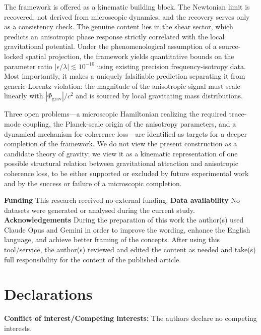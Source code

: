 \documentclass[a4paper,fleqn]{cas-dc}
\theoremstyle{thmstyleone}%
\theoremstyle{thmstyletwo}%
\begin{document}
The framework is offered as a kinematic building block. The
Newtonian limit is recovered, not derived from microscopic
dynamics, and the recovery serves only as a consistency check.
The genuine content lies in the shear sector, which predicts
an anisotropic phase response strictly correlated with the local 
gravitational potential. Under the phenomenological assumption 
of a source-locked spatial projection, the framework yields 
quantitative bounds on the parameter ratio 
$|\epsilon/\lambda| \lesssim 10^{-10}$ using existing precision 
frequency-isotropy data. Most importantly, it makes a uniquely 
falsifiable prediction separating it from generic Lorentz 
violation: the magnitude of the anisotropic signal must scale 
linearly with $|\Phi_{\mathrm{grav}}|/c^2$ and is sourced by 
local gravitating mass distributions.

Three open problems---a microscopic Hamiltonian realizing the
required trace-mode coupling, the Planck-scale origin of the
anisotropy parameters, and a dynamical mechanism for coherence
loss---are identified as targets for a deeper completion of the
framework. We do not view the present construction as a
candidate theory of gravity; we view it as a kinematic
representation of one possible structural relation between
gravitational attraction and anisotropic coherence loss, to be
either supported or excluded by future experimental work and by
the success or failure of a microscopic completion.



\textbf{Funding} This research received no external funding.
\textbf{Data availability} No datasets were generated or analysed during the current study.
\textbf{Acknowledgements} During the preparation of this work the author(s) used
Claude Opus and Gemini in order to improve the wording,
enhance the English language, and achieve better framing
of the concepts. After using this tool/service, the author(s)
reviewed and edited the content as needed and take(s) full
responsibility for the content of the published article.
\section*{Declarations}

\textbf{Conflict of interest/Competing interests:}
The authors declare no competing interests.


\end{document}
